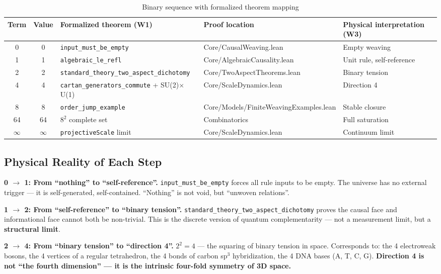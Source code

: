 \documentclass[aps,prd,twocolumn,nofootinbib,floatfix]{revtex4-2}
\begin{document}
\begin{table}[h]
\centering
\begin{tabular}{|c|c|l|l|l|}
\hline
Term & Value & Formalized theorem (W1) & Proof location & Physical interpretation (W3) \\
\hline
0 & 0 & \texttt{input\_must\_be\_empty} & Core/CausalWeaving.lean & Empty weaving \\
1 & 1 & \texttt{algebraic\_le\_refl} & Core/AlgebraicCausality.lean & Unit rule, self-reference \\
2 & 2 & \texttt{standard\_theory\_two\_aspect\_dichotomy} & Core/TwoAspectTheorems.lean & Binary tension \\
4 & 4 & \texttt{cartan\_generators\_commute} + SU(2)$\times$U(1) & Core/ScaleDynamics.lean & Direction 4 \\
8 & 8 & \texttt{order\_jump\_example} & Core/Models/FiniteWeavingExamples.lean & Stable closure \\
64 & 64 & $8^2$ complete set & Combinatorics & Full saturation \\
$\infty$ & $\infty$ & \texttt{projectiveScale} limit & Core/ScaleDynamics.lean & Continuum limit \\
\hline
\end{tabular}
\caption{Binary sequence with formalized theorem mapping}
\end{table}

\subsection{Physical Reality of Each Step}

\textbf{0 $\to$ 1: From ``nothing'' to ``self-reference''.} \texttt{input\_must\_be\_empty} forces all rule inputs to be empty. The universe has no external trigger --- it is self-generated, self-contained. ``Nothing'' is not void, but ``unwoven relations''.

\textbf{1 $\to$ 2: From ``self-reference'' to ``binary tension''.} \texttt{standard\_theory\_two\_aspect\_dichotomy} proves the causal face and informational face cannot both be non-trivial. This is the discrete version of quantum complementarity --- not a measurement limit, but a \textbf{structural limit}.

\textbf{2 $\to$ 4: From ``binary tension'' to ``direction 4''.} $2^2 = 4$ --- the squaring of binary tension in space. Corresponds to: the 4 electroweak bosons, the 4 vertices of a regular tetrahedron, the 4 bonds of carbon sp$^3$ hybridization, the 4 DNA bases (A, T, C, G). \textbf{Direction 4 is not ``the fourth dimension'' --- it is the intrinsic four-fold symmetry of 3D space.}
\end{document}
